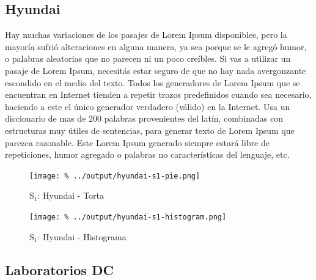 \documentclass[final,narroweqnarray,inline]{ieee}
\begin{document}
  \subsection{Hyundai}

Hay muchas variaciones de los pasajes de Lorem Ipsum disponibles, pero la mayoría sufrió alteraciones en alguna manera, ya sea porque se le agregó humor, o palabras aleatorias que no parecen ni un poco creíbles. Si vas a utilizar un pasaje de Lorem Ipsum, necesitás estar seguro de que no hay nada avergonzante escondido en el medio del texto. Todos los generadores de Lorem Ipsum que se encuentran en Internet tienden a repetir trozos predefinidos cuando sea necesario, haciendo a este el único generador verdadero (válido) en la Internet. Usa un diccionario de mas de 200 palabras provenientes del latín, combinadas con estructuras muy útiles de sentencias, para generar texto de Lorem Ipsum que parezca razonable. Este Lorem Ipsum generado siempre estará libre de repeticiones, humor agregado o palabras no características del lenguaje, etc.

    \begin{figure}[ht]\begin{center}
      \texttt{[image: \%
      ../output/hyundai-s1-pie.png]}
      \vspace{-2em}
      \caption{S$_1$: Hyundai - Torta}
      \label{hyundai-s1-pie}
    \end{center}\end{figure}

    \begin{figure}[ht]\begin{center}
      \texttt{[image: \%
      ../output/hyundai-s1-histogram.png]}
      \vspace{-2em}
      \caption{S$_1$: Hyundai - Histograma}
      \label{hyundai-s1-histogram}
    \end{center}\end{figure}

  \subsection{Laboratorios DC}
\end{document}
